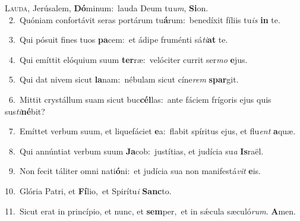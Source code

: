 \lettrine{\initial\textcolor{\initialcolor}{L}}{auda,} Jerúsalem, \textbf{Dó}\-minum:~\star lauda Deum tu\-\textit{um}\-, \textbf{Si}\-on.\\
{\numbfont\textcolor{\numbcolor}{~2.}}~Quóniam confortávit seras portárum tu\-\textbf{á}\-rum:~\star benedíxit fíliis tu\textit{is} \textbf{in} te.\par
{\numbfont\textcolor{\numbcolor}{~3.}}~Qui pósuit fines tuos \textbf{pa}\-cem:~\star et ádipe fruménti sá\-\textit{ti}\-\textbf{at} te.\par
{\numbfont\textcolor{\numbcolor}{~4.}}~Qui emíttit elóquium suum \textbf{ter}\-ræ:~\star velóciter currit ser\textit{mo} \textbf{e}\-jus.\par
{\numbfont\textcolor{\numbcolor}{~5.}}~Qui dat nivem sicut \textbf{la}\-nam:~\star nébulam sicut cíne\textit{rem} \textbf{spar}\-git.\par
{\numbfont\textcolor{\numbcolor}{~6.}}~Mittit crystállum suam sicut buc\-\textbf{cél}\-las:~\star ante fáciem frígoris ejus quis sus\-\textit{ti}\-\textbf{né}bit?\par
{\numbfont\textcolor{\numbcolor}{~7.}}~Emíttet verbum suum, et liquefáciet \textbf{e}\-a:~\star flabit spíritus ejus, et flu\textit{ent} \textbf{a}\-quæ.\par
{\numbfont\textcolor{\numbcolor}{~8.}}~Qui annúntiat verbum suum \textbf{Ja}\-cob:~\star justítias, et judícia su\textit{a} \textbf{Is}\-raël.\par
{\numbfont\textcolor{\numbcolor}{~9.}}~Non fecit táliter omni nati\-\textbf{ó}\-ni:~\star et judícia sua non manifestá\textit{vit} \textbf{e}\-is.\par
{\numbfont\textcolor{\numbcolor}{10.}}~Glória Patri, et \textbf{Fí}\-lio,~\star et Spirítu\textit{i} \textbf{Sanc}\-to.\par
{\numbfont\textcolor{\numbcolor}{11.}}~Sicut erat in princípio, et nunc, et \textbf{sem}\-per,~\star et in sǽcula sæculó\-\textit{rum}\-. \textbf{A}\-men.\par
